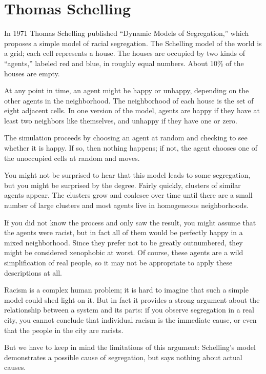 \documentclass[10pt]{book}
\begin{document}
\section{Thomas Schelling}

In 1971 Thomas Schelling published ``Dynamic Models of Segregation,''
which proposes a simple model of racial segregation.  The Schelling
model of the world is a grid; each cell represents a
house.  The houses are occupied by two kinds of ``agents,''
labeled red and blue, in roughly equal numbers.  About 10\% of the
houses are empty.

At any point in time, an agent might be happy or unhappy, depending
on the other agents in the neighborhood.
The neighborhood of each house is the set of
eight adjacent cells.
In one version of the model, agents are happy if they have at least
two neighbors like themselves, and unhappy if they have one or zero.

The simulation proceeds by choosing an agent at random and checking
to see whether it is happy.  If so, then nothing happens; if not,
the agent chooses one of the unoccupied cells at
random and moves.

You might not be surprised to hear that this model leads to some
segregation, but you might be surprised by the degree.  Fairly
quickly, clusters of similar agents appear.  The clusters
grow and coalesce over time until there are a small number
of large clusters and most agents live in homogeneous
neighborhoods.

If you did not know the process and only saw the result, you might
assume that the agents were racist, but in fact all of them
would be perfectly happy in a mixed neighborhood.  Since they prefer
not to be greatly outnumbered, they might be considered xenophobic at
worst.  Of course, these agents are a wild simplification of real
people, so it may not be appropriate to apply these descriptions at
all.

Racism is a complex human problem; it is hard to imagine that such a
simple model could shed light on it.  But in fact it provides a strong
argument about the relationship between a system and its parts: if you
observe segregation in a real city, you cannot conclude that
individual racism is the immediate cause, or even that the people in
the city are racists.

But we have to keep in mind the limitations of this argument:
Schelling's model demonstrates a possible cause of segregation, but
says nothing about actual causes.
\end{document}
